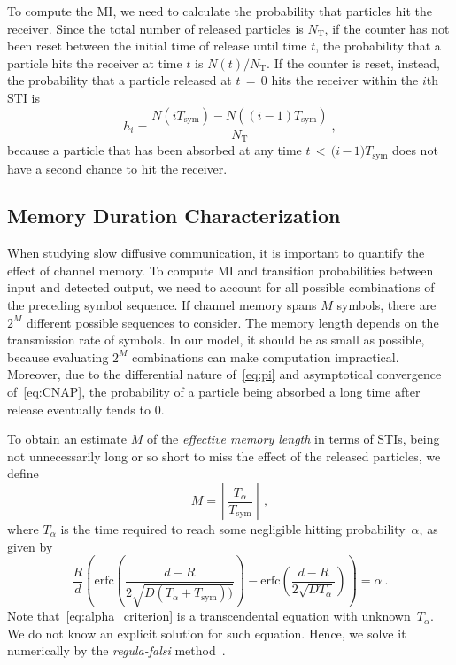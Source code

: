 \documentclass[journal]{IEEEtranTCOM}
\begin{document}
To compute the MI, we need to calculate the probability that particles hit the receiver. Since the total number of released particles is $N_{\mathrm{T}}$, if the counter has not been reset between the initial time of release until time $t$, the probability that a particle hits the receiver at time $t$ is $N(t)/N_{\mathrm{T}}$. If the counter is reset, instead, the probability that a particle released at $t$$\,=\,$$0$ hits the receiver within the $i$th STI is 
\begin{equation}
    h_{i} = \frac{N(iT_{\mathrm{sym}})-N((i-1)T_{\mathrm{sym}})}{N_{\mathrm{T}}}~, \label{eq:pi}
\end{equation}
because a particle that has been absorbed at any time $t$$\,<\,$$(i$\,$-$\,$1) T_{\mathrm{sym}}$ does not have a second chance to hit the receiver.
\subsection{Memory Duration Characterization}
\par When studying slow diffusive communication, it is important to quantify the effect of channel memory. To compute MI and transition probabilities between input and detected output, we need to account for all possible combinations of the preceding symbol sequence. If channel memory spans $M$ symbols, there are $2^{M}$ different possible sequences to consider. The memory length depends on the transmission rate of symbols. In our model, it should be as small as possible, because evaluating $2^{M}$ combinations can make computation impractical. Moreover, due to the differential nature of~\eqref{eq:pi} and asymptotical convergence of~\eqref{eq:CNAP}, the probability of a particle being absorbed a long time after release eventually tends to $0$. 

\par To obtain an estimate $M$ of the \emph{effective memory length} in terms of STIs, being not unnecessarily long or so short to miss the effect of the released particles, we define
\begin{equation}
    M = \left\lceil \frac{T_{\alpha}}{T_{\mathrm{sym}}} \right\rceil~,
\end{equation}
where $T_{\alpha}$ is the time required to reach some negligible hitting probability~$\alpha$, as given by
\begin{equation}
    \frac{R}{d}\left ( \mathrm{erfc}\left ( \frac{d-R}{2\sqrt{D(T_{\alpha}+T_{\mathrm{sym}}))}} \right ) -\mathrm{erfc}\left ( \frac{d-R}{2\sqrt{DT_{\alpha}}} \right ) \right )= \alpha~.\label{eq:alpha_criterion}
\end{equation}
Note that~\eqref{eq:alpha_criterion} is a transcendental equation with unknown~$T_{\alpha}$. We do not know an explicit solution for such equation. Hence, we solve it numerically by the \textit{regula-falsi} method~\cite{conte2017elementary}.
\end{document}
